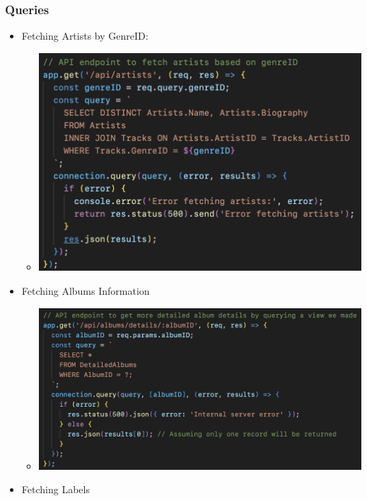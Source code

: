\documentclass{article}
\begin{document}
    \subsubsection{Queries}
    \begin{itemize} 
        \item Fetching Artists by GenreID:
				\begin{itemize}
					\item \includegraphics[width=\linewidth]{Queries/fetchArtistsByGenreID.png}
				\end{itemize}
				\item Fetching Albums Information
				\begin{itemize}
					\item \includegraphics[width=\linewidth]{Queries/fetchDetailedAlbums.png}
				\end{itemize}
				\item Fetching Labels
				\begin{itemize}

\end{itemize}
\end{itemize}
\end{document}
